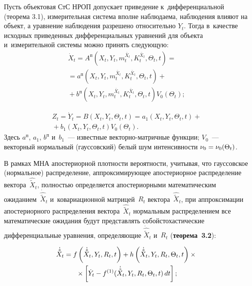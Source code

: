 \begin{multicols}{2}
Пусть объектовая СтС НРОП допускает приведение к~дифференциальной (теорема 3.1), 
измерительная система вполне наблюдаема, наблюдения влияют на объект, а 
уравнение наблюдения разрешено относительно $Y_t$. Тогда в~качестве исходных 
приведенных дифференциальных уравнений для объекта и~измерительной сис\-те\-мы можно 
принять следующую:
   \begin{multline*}
   \dot X_t =A^{\mbox{п}}\left( X_t, Y_t, m_t^{\bar X_t}, K_t^{\bar X_t},\Theta_t, t\right)= {}\\
   {}=
   a^{\mbox{п}}\left( X_t, Y_t, m_t^{\bar X_t}, K_t^{\bar X_t},\Theta_t, t\right) + {}\\
   {}+
   b^{\mbox{п}}\left( X_t, Y_t,  m_t^{\bar X_t}, K_t^{\bar X_t},\Theta_t, t\right) V_0  (\Theta_t);
\end{multline*}



\noindent
\begin{multline*}
Z_t = \dot Y_t =B\left( X_t, Y_t, \Theta_t,t\right)= a_1 \left( X_t, Y_t, \Theta_t, t\right) + {}\\
{}+ b_1\left( X_t, Y_t, \Theta_t,t\right) V_0 (\Theta_t).
\end{multline*}
Здесь $a^{\mbox{п}}$, $a_1$, $b^{\mbox{п}}$ и~$b_1$~--- известные век\-тор\-но-мат\-рич\-ные 
функции; $V_0$~--- векторный нормальный (гауссовский) белый шум интенсивности 
$\nu_0 \hm= \nu_0 (\Theta_t)$.

В рамках МНА апостериорной плот\-ности 
ве\-ро\-ят\-ности, учитывая, что
гауссовское (нормальное) распределение, ап\-прок\-си\-ми\-ру\-ющее
апостериорное распределение вектора~$\hat{\tilde X}_t$, пол\-ностью определяется
апостериорными математическим ожиданием~$\dot{\hat{\tilde X}}_t$\linebreak
 и~ковариационной мат\-ри\-цей~$R_t$ вектора~$\hat{\tilde X}_t$, при аппроксимации
апостериорного распределения вектора~$\hat{\tilde  X}_t$ нормальным
распределением все математические ожидания будут
пред\-став\-лять собой\linebreak стохастические дифференциальные уравнения,
опре\-де\-ля\-ющие $\dot{\hat{\tilde  X}}_t$ и~$R_t$ (\textbf{теорема~3.2}):

\vspace*{-4pt}

\noindent
\begin{multline}
\dot{\hat{\tilde  X}}_t = f \left(\dot{\hat{\tilde  X}}_t, Y_t,R_t,t\right) +
    h\left(\dot{\hat{\tilde  X}}_t,Y_t, R_t,\Theta_t, t\right)\times{}\\
    {}\times
    \left[\dot Y_t - f^{(1)} 
(\dot{\hat{\tilde  X}}_t,Y_t,
    R_t,\Theta_t,t)\,dt\right];\label{e3.7-s}
    \end{multline}
    

\end{multicols}
